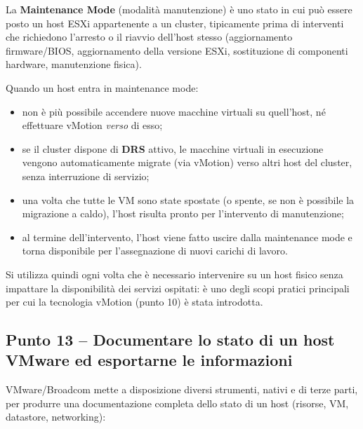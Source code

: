 \documentclass[11pt,a4paper]{article}
\begin{document}
La \textbf{Maintenance Mode} (modalità manutenzione) è uno stato in cui può essere posto un host ESXi appartenente a un cluster, tipicamente prima di interventi che richiedono l'arresto o il riavvio dell'host stesso (aggiornamento firmware/BIOS, aggiornamento della versione ESXi, sostituzione di componenti hardware, manutenzione fisica).

Quando un host entra in maintenance mode:
\begin{itemize}[nosep]
    \item non è più possibile accendere nuove macchine virtuali su quell'host, né effettuare vMotion \emph{verso} di esso;
    \item se il cluster dispone di \textbf{DRS} attivo, le macchine virtuali in esecuzione vengono automaticamente migrate (via vMotion) verso altri host del cluster, senza interruzione di servizio;
    \item una volta che tutte le VM sono state spostate (o spente, se non è possibile la migrazione a caldo), l'host risulta pronto per l'intervento di manutenzione;
    \item al termine dell'intervento, l'host viene fatto uscire dalla maintenance mode e torna disponibile per l'assegnazione di nuovi carichi di lavoro.
\end{itemize}

Si utilizza quindi ogni volta che è necessario intervenire su un host fisico senza impattare la disponibilità dei servizi ospitati: è uno degli scopi pratici principali per cui la tecnologia vMotion (punto 10) è stata introdotta.

\subsection{Punto 13 -- Documentare lo stato di un host VMware ed esportarne le informazioni}

VMware/Broadcom mette a disposizione diversi strumenti, nativi e di terze parti, per produrre una documentazione completa dello stato di un host (risorse, VM, datastore, networking):
\end{document}
